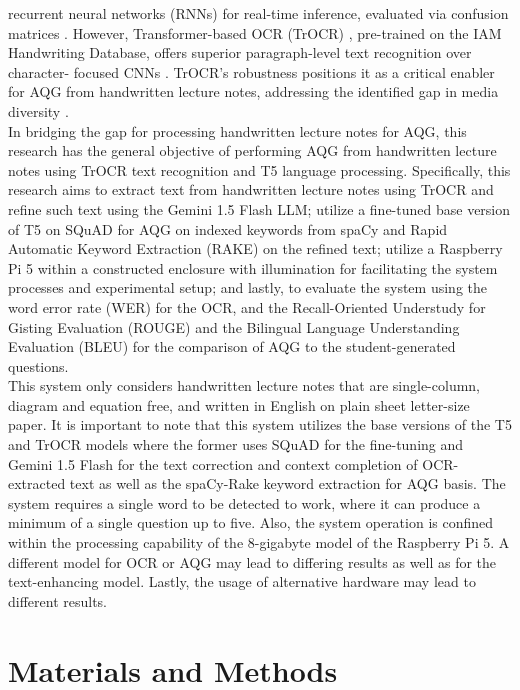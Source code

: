 \documentclass[conference]{IEEEtran}
\begin{document}
recurrent neural networks (RNNs) for real-time inference, evaluated via confusion matrices \cite{Ishikawa2020} \cite{Villaverde2023}. However, Transformer-based OCR (TrOCR) 
\cite{Li2021}, pre-trained on the IAM Handwriting Database, offers superior paragraph-level text recognition over character-
focused CNNs \cite{Mortadi2023}. TrOCR’s robustness positions it as a critical enabler for AQG from handwritten lecture notes, addressing the identified gap in media diversity \cite{Arbaaeen2020}. 
\\
\indent In bridging the gap for processing handwritten lecture notes for AQG, this research has the 
general objective of performing AQG from handwritten lecture
notes using TrOCR text recognition and T5 language processing.
Specifically, this research aims to extract text from
handwritten lecture notes using TrOCR and refine such text 
using the Gemini 1.5 Flash LLM; utilize 
a fine-tuned base version of T5 on SQuAD for AQG on 
indexed keywords from spaCy and Rapid Automatic Keyword 
Extraction (RAKE) on the refined text; utilize a Raspberry 
Pi 5 within a constructed enclosure with illumination 
for facilitating the system processes and experimental setup;
and lastly, to evaluate the system using the word error 
rate (WER) for the OCR, and the Recall-Oriented Understudy for 
Gisting Evaluation (ROUGE) and the Bilingual Language Understanding 
Evaluation (BLEU) for the comparison of AQG to the 
student-generated questions.
\\
\indent This system only considers handwritten lecture notes 
that are single-column, diagram and equation free, and written 
in English on plain sheet letter-size paper. It is important to note that 
this system utilizes the base versions of the T5 and TrOCR models where the 
former uses SQuAD for the fine-tuning and Gemini 1.5 Flash for the 
text correction and context completion of OCR-extracted text as well as 
the spaCy-Rake keyword extraction for AQG basis. The system 
requires a single word to be detected to work, where it can 
produce a minimum of a single question up to five. Also, the system operation is confined 
within the processing capability of the 8-gigabyte model of the Raspberry Pi 5.
A different model for OCR or AQG may lead to differing results as well as 
for the text-enhancing model. Lastly, the usage of alternative hardware 
may lead to different results.
\section{Materials and Methods}
\end{document}

